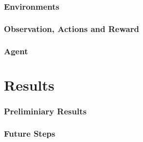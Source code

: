 \documentclass{beamer}
\begin{document}
\begin{frame}
    \frametitle{Environments}
\end{frame}

\begin{frame}
    \frametitle{Observation, Actions and Reward}
\end{frame}

\begin{frame}
    \frametitle{Agent}
\end{frame}


\section{Results}

\begin{frame}
    \frametitle{Preliminiary Results}
\end{frame}

\begin{frame}
    \frametitle{Future Steps}
\end{frame}
\end{document}
